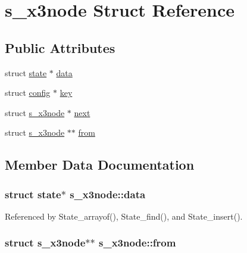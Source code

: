 \hypertarget{structs__x3node}{\section{s\-\_\-x3node Struct Reference}
\label{structs__x3node}
}
\subsection*{Public Attributes}
\begin{DoxyCompactItemize}
\item 
struct \hyperlink{structstate}{state} $\ast$ \hyperlink{structs__x3node_ae6f398ede3751205b67e5851e3bc09fc}{data}
\item 
struct \hyperlink{structconfig}{config} $\ast$ \hyperlink{structs__x3node_ad8634c743549932f3f7c19f834592021}{key}
\item 
struct \hyperlink{structs__x3node}{s\-\_\-x3node} $\ast$ \hyperlink{structs__x3node_ab2d7b565ebfc43ea239a90068fdf3670}{next}
\item 
struct \hyperlink{structs__x3node}{s\-\_\-x3node} $\ast$$\ast$ \hyperlink{structs__x3node_ae629af843f05c799fd117c15ff368fe8}{from}
\end{DoxyCompactItemize}


\subsection{Member Data Documentation}
\hypertarget{structs__x3node_ae6f398ede3751205b67e5851e3bc09fc}{
\subsubsection[{data}]{\setlength{\rightskip}{0pt plus 5cm}struct {\bf state}$\ast$ s\-\_\-x3node\-::data}}\label{structs__x3node_ae6f398ede3751205b67e5851e3bc09fc}


Referenced by State\-\_\-arrayof(), State\-\_\-find(), and State\-\_\-insert().

\hypertarget{structs__x3node_ae629af843f05c799fd117c15ff368fe8}{
\subsubsection[{from}]{\setlength{\rightskip}{0pt plus 5cm}struct {\bf s\-\_\-x3node}$\ast$$\ast$ s\-\_\-x3node\-::from}}\label{structs__x3node_ae629af843f05c799fd117c15ff368fe8}


